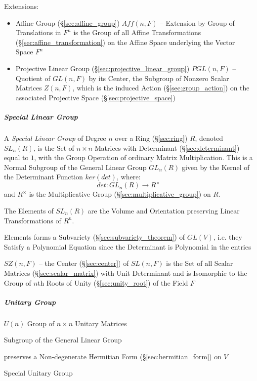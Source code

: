 Extensions:
\begin{itemize}
  \item Affine Group (\S\ref{sec:affine_group}) $Aff(n,F)$ -- Extension by
    Group of Translations in $F^n$ is the Group of all Affine Transformations
    (\S\ref{sec:affine_transformation}) on the Affine Space underlying the
    Vector Space $F^n$
  \item Projective Linear Group (\S\ref{sec:projective_linear_group})
    $PGL(n,F)$ -- Quotient of $GL(n,F)$ by its Center, the Subgroup of Nonzero
    Scalar Matrices $Z(n,F)$, which is the induced Action
    (\S\ref{sec:group_action}) on the associated Projective Space
    (\S\ref{sec:projective_space})
\end{itemize}



\subparagraph{Special Linear Group}\label{sec:special_linear_group}\hfill

A \emph{Special Linear Group} of Degree $n$ over a Ring (\S\ref{sec:ring}) $R$,
denoted $SL_n(R)$, is the Set of $n \times n$ Matrices with Determinant
(\S\ref{sec:determinant}) equal to $1$, with the Group Operation of ordinary
Matrix Multiplication. This is a Normal Subgroup of the General Linear Group
$GL_n(R)$ given by the Kernel of the Determinant Function $ker(det)$, where:
\[
  det : GL_n(R) \rightarrow R^\times
\]
and $R^\times$ is the Multiplicative Group
(\S\ref{sec:multiplicative_group}) on $R$.

The Elements of $SL_n(R)$ are the Volume and Orientation preserving
Linear Transformations of $R^n$.

Elements forms a Subvariety (\S\ref{sec:subvariety_theorem}) of $GL(V)$, i.e.
they Satisfy a Polynomial Equation since the Determinant is Polynomial in the
entries

$SZ(n,F)$ -- the Center (\S\ref{sec:center}) of $SL(n,F)$ is the Set of all
Scalar Matrices (\S\ref{sec:scalar_matrix}) with Unit Determinant and is
Isomorphic to the Group of $n$th Roots of Unity (\S\ref{sec:unity_root}) of the
Field $F$



\subparagraph{Unitary Group}\label{sec:unitary_group}\hfill

$U(n)$ Group of $n \times n$ Unitary Matrices

Subgroup of the General Linear Group

preserves a Non-degenerate Hermitian Form (\S\ref{sec:hermitian_form}) on $V$

Special Unitary Group

